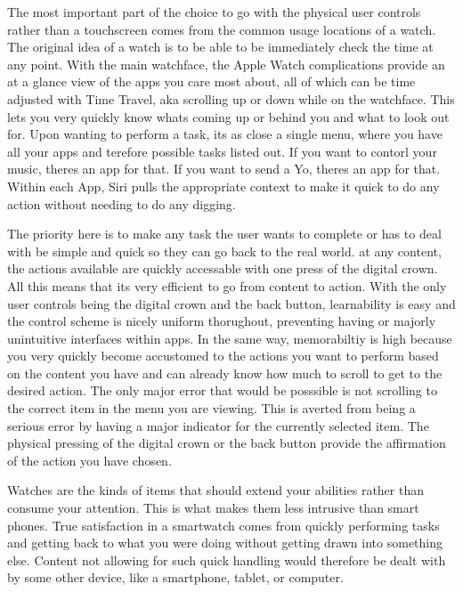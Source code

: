 \documentclass[journal,letterpaper]{article}
\begin{document}
    The most important part of the choice to go with the physical user controls rather than a touchscreen comes from the common usage locations of a watch. The original idea of a watch is to be able to be immediately check the time at any point. With the main watchface, the Apple Watch complications provide an at a glance view of the apps you care most about, all of which can be time adjusted with Time Travel, aka scrolling up or down while on the watchface. This lets you very quickly know whats coming up or behind you and what to look out for. Upon wanting to perform a task, its as close a single menu, where you have all your apps and terefore possible tasks listed out. If you want to contorl your music, theres an app for that. If you want to send a Yo, theres an app for that. Within each App, Siri pulls the appropriate context to make it quick to do any action without needing to do any digging. 

    The priority here is to make any task the user wants to complete or has to deal with be simple and quick so they can go back to the real world. at any content, the actions available are quickly accessable with one press of the digital crown. All this means that its very efficient to go from content to action. With the only user controls being the digital crown and the back button, learnability is easy and the control scheme is nicely uniform thorughout, preventing having  or majorly unintuitive interfaces within apps. In the same way, memorabiltiy is high because you very quickly become accustomed to the actions you want to perform based on the content you have and can already know how much to scroll to get to the desired action. The only major error that would be posssible is not scrolling to the correct item in the menu you are viewing. This is averted from being a serious error by having a major indicator for the currently selected item. The physical pressing of the digital crown or the back button provide the affirmation of the action you have chosen.

    Watches are the kinds of items that should extend your abilities rather than consume your attention. This is what makes them less intrusive than smart phones. True satisfaction in a smartwatch comes from quickly performing tasks and getting back to what you were doing without getting drawn into something else. Content not allowing for such quick handling would therefore be dealt with by some other device, like a smartphone, tablet, or computer. 
\end{document}
